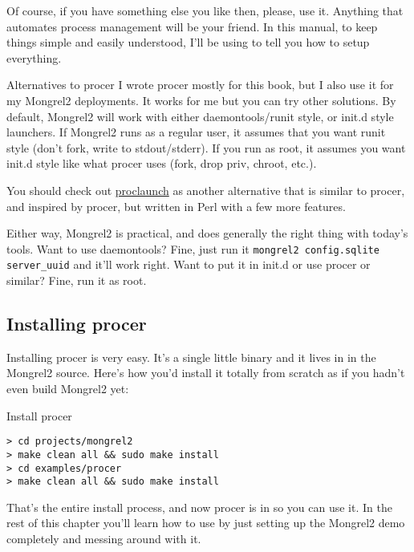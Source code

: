 Of course, if you have something else you like then, please, use it.  Anything that automates
process management will be your friend.  In this manual, to keep things simple and easily
understood, I'll be using  to tell you how to setup everything.

\begin{aside}{Alternatives to procer}
I wrote procer mostly for this book, but I also use it for my Mongrel2 deployments.
It works for me but you can try other solutions.  By default, Mongrel2 will work with
either daemontools/runit style, or init.d style launchers.  If Mongrel2 runs as a
regular user, it assumes that you want runit style (don't fork, write to stdout/stderr).
If you run as root, it assumes you want init.d style like what procer uses (fork, drop priv, 
chroot, etc.).

You should check out \href{http://github.com/peterkeen/proclaunch}{proclaunch} as another
alternative that is similar to procer, and inspired by procer, but written in Perl with a
few more features.

Either way, Mongrel2 is practical, and does generally the right thing with today's tools.
Want to use daemontools?  Fine, just run it \verb|mongrel2 config.sqlite server_uuid| and it'll
work right.  Want to put it in init.d or use procer or similar?  Fine, run it as root.
\end{aside}


\subsection{Installing procer}

Installing procer is very easy.  It's a single little binary and it lives in
 in the Mongrel2 source.  Here's how you'd install it
totally from scratch as if you hadn't even build Mongrel2 yet:

\begin{code}{Install procer}
\begin{lstlisting}
> cd projects/mongrel2
> make clean all && sudo make install
> cd examples/procer
> make clean all && sudo make install
\end{lstlisting}
\end{code}

That's the entire install process, and now procer is in 
so you can use it.  In the rest of this chapter you'll learn how to use 
by just setting up the Mongrel2 demo completely and messing around with it.



